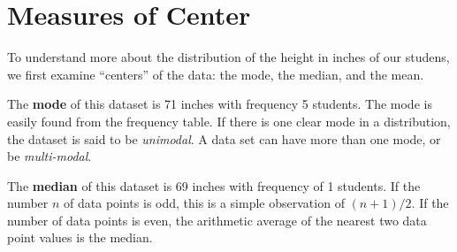 \documentclass[nohyper,justified]{tufte-handout}\usepackage[]{graphicx}\usepackage[]{color}
\begin{document}
\begin{table}[ht]
\centering
{}
\caption{Frequency Table} 
\end{table}


\section{Measures of Center}


To understand more about the distribution of the height in inches of our studens, we first examine ``centers'' of the data: the mode, the median, and the mean.

The \textbf{mode} of this dataset is 71 inches with frequency 5 students. The mode is easily found from the frequency table. If there is one clear mode in a distribution, the dataset is said to be \textit{unimodal}. A data set can have more than one mode, or be \textit{multi-modal}.

The \textbf{median} of this dataset is 69 inches with frequency of 1 students. If the number $n$ of data points is odd, this is a simple observation of $(n+1)/2$. If the number of data points is even, the arithmetic average of the nearest two data point values is the median.
\end{document}
